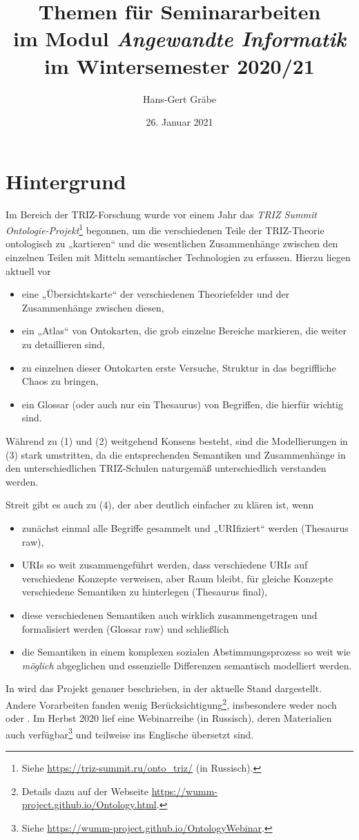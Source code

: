 \documentclass[11pt,a4paper]{article}
\title{Themen für Seminararbeiten\\ im Modul \emph{Angewandte Informatik}\\ im
  Wintersemester 2020/21}
\author{Hans-Gert Gr\"abe}
\date{26. Januar 2021}
\begin{document}
\maketitle

\section{Hintergrund}

Im Bereich der TRIZ-Forschung wurde vor einem Jahr das \emph{TRIZ Summit
  Ontologie-Projekt}\footnote{Siehe \url{https://triz-summit.ru/onto_triz/}
  (in Russisch).}  begonnen, um die verschiedenen Teile der TRIZ-Theorie
ontologisch zu „kartieren“ und die wesentlichen Zusammenhänge zwischen den
einzelnen Teilen mit Mitteln semantischer Technologien zu erfassen. Hierzu
liegen aktuell vor
\begin{itemize}[noitemsep]
\item[(1)] eine „Übersichtskarte“ der verschiedenen Theoriefelder und der
  Zusammenhänge zwischen diesen,
\item[(2)] ein „Atlas“ von Ontokarten, die grob einzelne Bereiche markieren,
  die weiter zu detaillieren sind,
\item[(3)] zu einzelnen dieser Ontokarten erste Versuche, Struktur in das
  begriff\-liche Chaos zu bringen,
\item[(4)] ein Glossar (oder auch nur ein Thesaurus) von Begriffen, die
  hierfür wichtig sind.
\end{itemize}

Während zu (1) und (2) weitgehend Konsens besteht, sind die Modellierungen in
(3) stark umstritten, da die entsprechenden Semantiken und Zusammenhänge in
den unterschiedlichen TRIZ-Schulen naturgemäß unterschiedlich verstanden
werden.

Streit gibt es auch zu (4), der aber deutlich einfacher zu klären ist, wenn 
\begin{itemize}[noitemsep]
\item[(4a)] zunächst einmal alle Begriffe gesammelt und „URIfiziert“ werden
  (Thesaurus raw),
\item[(4b)] URIs so weit zusammengeführt werden, dass verschiedene URIs auf
  verschiedene Konzepte verweisen, aber Raum bleibt, für gleiche Konzepte
  verschiedene Semantiken zu hinterlegen (Thesaurus final),
\item[(4c)] diese verschiedenen Semantiken auch wirklich zusammengetragen und
  formalisiert werden (Glossar raw) und schließlich
\item[(4d)] die Semantiken in einem komplexen sozialen Abstimmungsprozess so
  weit wie \emph{möglich} abgeglichen und essenzielle Differenzen semantisch
  modelliert werden. 
\end{itemize}
In \cite{Kuryan2019} wird das Projekt genauer beschrieben, in
\cite{Kuryan2020} der aktuelle Stand dargestellt. Andere Vorarbeiten fanden
wenig Berücksichtigung\footnote{Details dazu auf der Webseite
  \url{https://wumm-project.github.io/Ontology.html}.}, insbesondere weder
\cite{IDM2011} noch \cite{GSA} oder \cite{VDI}. Im Herbst 2020 lief eine
Webinarreihe (in Russisch), deren Materialien auch verfügbar\footnote{Siehe
  \url{https://wumm-project.github.io/OntologyWebinar}.} und teilweise ins
Englische übersetzt sind.
\end{document}

